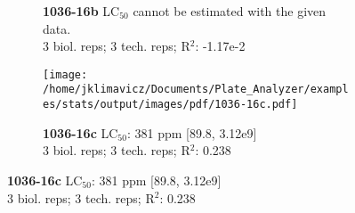 \documentclass{article}
\begin{document}
\begin{figure}[thp!]
\begin{subfigure}{0.500\textwidth}
      \vspace{-0.05cm}
      \caption*{\textbf{1036-16b} LC$_{50}$ cannot be estimated with the given data. \\ 
3 biol. reps; 3 tech. reps; R$^2$: -1.17e-2}
      \vspace{0.1cm}
   \end{subfigure}%
   \begin{subfigure}{0.500\textwidth}
      \centering
      \texttt{[image: /home/jklimavicz/Documents/Plate\_Analyzer/examples/stats/output/images/pdf/1036-16c.pdf]}
      \vspace{-0.05cm}
      \caption*{\textbf{1036-16c} LC$_{50}$: 381 ppm [89.8, 3.12e9] \\ 
3 biol. reps; 3 tech. reps; R$^2$: 0.238}
      \vspace{0.1cm}
   \end{subfigure}%
\end{figure}
\clearpage
\pagebreak
\vspace{-0.1cm}
\end{document}
